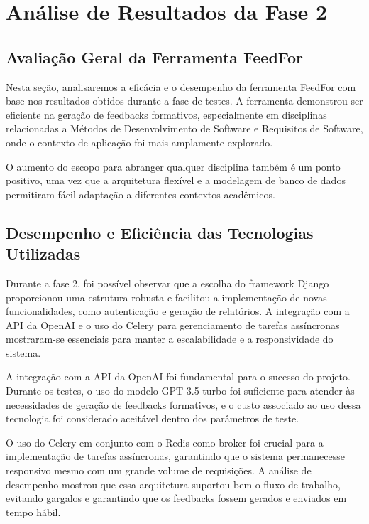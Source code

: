 \chapter{Análise de Resultados da Fase 2}

\section{Avaliação Geral da Ferramenta FeedFor}

Nesta seção, analisaremos a eficácia e o desempenho da ferramenta FeedFor com base nos resultados obtidos durante a fase de testes. A ferramenta demonstrou ser eficiente na geração de feedbacks formativos, especialmente em disciplinas relacionadas a Métodos de Desenvolvimento de Software e Requisitos de Software, onde o contexto de aplicação foi mais amplamente explorado.

O aumento do escopo para abranger qualquer disciplina também é um ponto positivo, uma vez que a arquitetura flexível e a modelagem de banco de dados permitiram fácil adaptação a diferentes contextos acadêmicos.

\section{Desempenho e Eficiência das Tecnologias Utilizadas}

Durante a fase 2, foi possível observar que a escolha do framework Django proporcionou uma estrutura robusta e facilitou a implementação de novas funcionalidades, como autenticação e geração de relatórios. A integração com a API da OpenAI e o uso do Celery para gerenciamento de tarefas assíncronas mostraram-se essenciais para manter a escalabilidade e a responsividade do sistema.

A integração com a API da OpenAI foi fundamental para o sucesso do projeto. Durante os testes, o uso do modelo GPT-3.5-turbo foi suficiente para atender às necessidades de geração de feedbacks formativos, e o custo associado ao uso dessa tecnologia foi considerado aceitável dentro dos parâmetros de teste.

O uso do Celery em conjunto com o Redis como broker foi crucial para a implementação de tarefas assíncronas, garantindo que o sistema permanecesse responsivo mesmo com um grande volume de requisições. A análise de desempenho mostrou que essa arquitetura suportou bem o fluxo de trabalho, evitando gargalos e garantindo que os feedbacks fossem gerados e enviados em tempo hábil.


